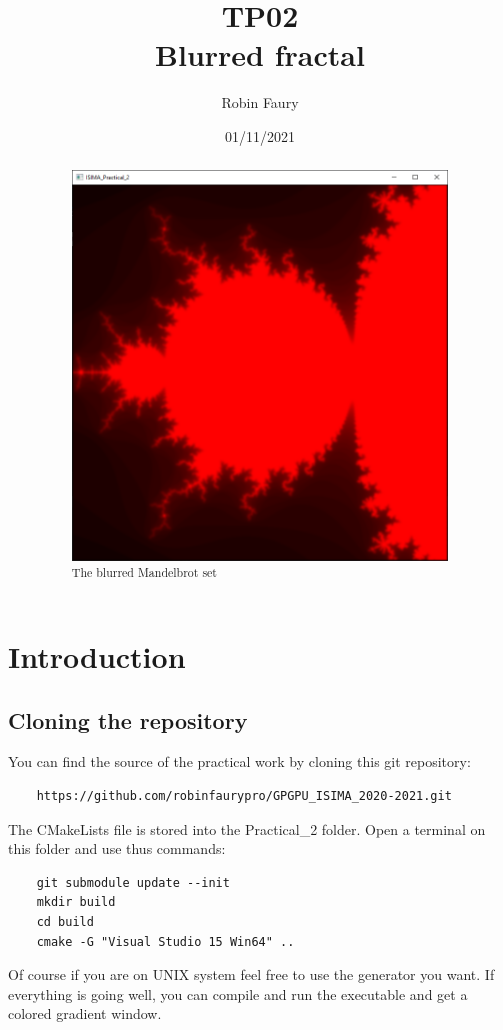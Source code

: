 \documentclass{article}
\begin{document}
\title{TP02\\Blurred fractal}
\author{Robin Faury}
\date{01/11/2021}
\maketitle

\begin{abstract}
	\begin{figure}[H]
		\centering
		\includegraphics[scale=0.6]{images/Mandelbrot_blur.png}
		\caption{The blurred Mandelbrot set}
	\end{figure}
\end{abstract}

\newpage
\section{Introduction}
\subsection{Cloning the repository}
You can find the source of the practical work by cloning this git repository:
\begin{lstlisting}
	https://github.com/robinfaurypro/GPGPU_ISIMA_2020-2021.git
\end{lstlisting}
The CMakeLists file is stored into the Practical\_2 folder. Open a terminal on this folder and use thus commands:
\begin{lstlisting}
	git submodule update --init
	mkdir build
	cd build
	cmake -G "Visual Studio 15 Win64" ..
\end{lstlisting}
Of course if you are on UNIX system feel free to use the generator you want.
If everything is going well, you can compile and run the executable and get a colored gradient window.
\end{document}
